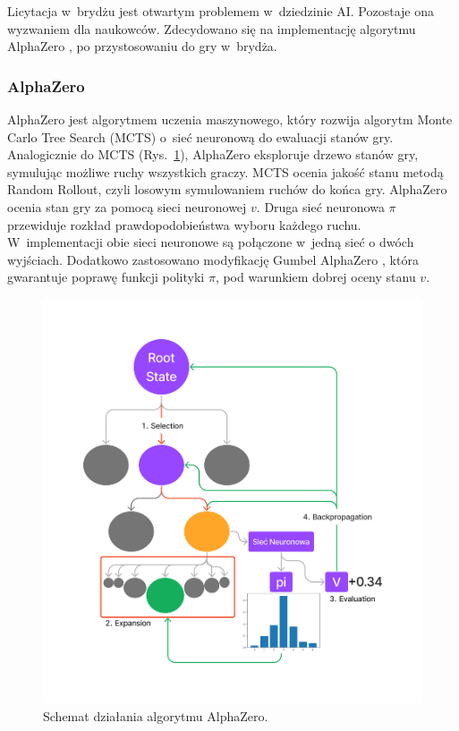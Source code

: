 Licytacja w~brydżu jest otwartym problemem w~dziedzinie AI.
Pozostaje ona wyzwaniem dla naukowców.
Zdecydowano się na implementację algorytmu AlphaZero \cite{AlphaZeroPaper},
po przystosowaniu do gry w~brydża.

\subsubsection{AlphaZero}

AlphaZero jest algorytmem uczenia maszynowego, który rozwija
algorytm Monte Carlo Tree Search (MCTS) o~sieć neuronową do ewaluacji
stanów gry.
Analogicznie do MCTS (Rys.~\ref{fig:ai-alphazero}),
AlphaZero eksploruje drzewo stanów gry,
symulując możliwe ruchy wszystkich graczy.
MCTS ocenia jakość stanu metodą Random Rollout, czyli
losowym symulowaniem ruchów do końca gry.
AlphaZero ocenia stan gry za pomocą sieci neuronowej $v$.
Druga sieć neuronowa $\pi$ przewiduje rozkład
prawdopodobieństwa wyboru każdego ruchu.
W~implementacji obie sieci neuronowe są połączone w~jedną
sieć o dwóch wyjściach.
Dodatkowo zastosowano modyfikację
Gumbel AlphaZero \cite{GumbelAZ},
która gwarantuje poprawę funkcji polityki $\pi$, pod warunkiem
dobrej oceny stanu $v$.


\begin{figure}[h!]
    \centering
    \includegraphics[width=\textwidth]{img/ai/alphazero.png}
    \caption{Schemat działania algorytmu AlphaZero.}
    \label{fig:ai-alphazero}
\end{figure}


